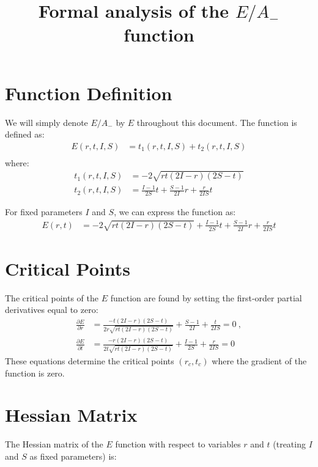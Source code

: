 \documentclass[a4paper]{article}
\title{Formal analysis of the $E/A_{-}$ function}
\author{}
\date{}
\begin{document}
\maketitle

\section{Function Definition}

We will simply denote $E/A_{-}$ by $E$ throughout this document. The function is defined as:
\begin{align}
E(r,t,I,S) &= t_1(r,t,I,S) + t_2(r,t,I,S)\\
\end{align}
where:
\begin{align}
t_1(r,t,I,S) &= -2\sqrt{rt(2I-r)(2S-t)}\\
t_2(r,t,I,S) &= \frac{I-1}{2S}t + \frac{S-1}{2I}r + \frac{r}{2IS}t
\label{terms}
\end{align}

For fixed parameters $I$ and $S$, we can express the function as:
\begin{align}
E(r,t) &= -2\sqrt{rt(2I-r)(2S-t)} + \frac{I-1}{2S}t + \frac{S-1}{2I}r + \frac{r}{2IS}t
\end{align}

\section{Critical Points}
The critical points of the $E$ function are found by setting the first-order partial derivatives equal to zero:
\begin{align}
\frac{\partial E}{\partial r} &= \frac{-t(2I-r)(2S-t)}{2r\sqrt{rt(2I-r)(2S-t)}} + \frac{S-1}{2I} + \frac{t}{2IS} = 0\ ,\nonumber\\
\frac{\partial E}{\partial t} &= \frac{-r(2I-r)(2S-t)}{2t\sqrt{rt(2I-r)(2S-t)}} + \frac{I-1}{2S} + \frac{r}{2IS} = 0
\label{system-eq}
\end{align}
These equations determine the critical points $(r_c, t_c)$ where the gradient of the function is zero.

\section{Hessian Matrix}

The Hessian matrix of the $E$ function with respect to variables $r$ and $t$ (treating $I$ and $S$ as fixed parameters) is:
\end{document}
